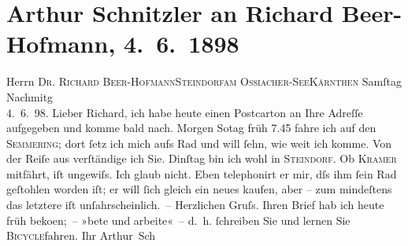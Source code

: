 

         
         \renewcommand{\erwaehntePersonen}{Personen: Richard Beer-Hofmann, Leopold Kramer}
         \renewcommand{\erwaehnteOrte}{Orte: I., Innere Stadt, Kärnten, Ossiacher See, Semmering, Steindorf am Ossiacher See, Wien}
         \renewcommand{\erwaehnteWerke}{}
               \section[Arthur Schnitzler an Richard Beer-Hofmann, 4. 6. 1898]{ Arthur Schnitzler an Richard Beer-Hofmann, 4. 6. 1898}\nopagebreak{}\rehead{ }\begin{ledgroupsized}[t]{13cm}\normalsize\beginnumbering \toendnotes[C]{\smallbreak\pagebreak[2]} 
\pstart{}{\pb}Herrn \textsc{Dr. Richard
                     Beer-Hofmann}\pend{}\pstart{}\textsc{Steindorf}\pend{}\pstart{}\textsc{am Ossiacher-See}\pend{}\pstart{}\textsc{Kärnthen}\pend{}{\bigskip}\pstart
           \raggedleft{}{\pb}Samſtag{ }Nachmitg{\\}4. 6. 98.\pend
           \pstart
           Lieber Richard, ich habe heute einen Postcarton an Ihre Adreſſe
               aufgegeben und komme bald nach. Morgen So{\geminationn}tag{ }früh 7.45 fahre ich auf den \textsc{Semmering}; dort ſetz ich mich aufs Rad und will ſehn, wie weit ich komme. Von der {\pb}Reiſe aus verſtändige ich Sie. Dinſtag
               bin ich wohl in \textsc{Steindorf}. Ob \textsc{Kramer} mitfährt, iſt ungewiſs. Ich glaub nicht. Eben telephonirt er mir, dſs ihm ſein
               Rad geſtohlen worden iſt; er will ſich gleich ein neues kaufen, aber – zum mindeſtens
               das letztere {\pb}iſt unſahrscheinlich. –\pend
           \pstart
           Herzlichen Gruſs. Ihren Brief hab ich heute früh beko{\geminationm}en; – »bete und arbeite« – d. h. ſchreiben Sie und lernen Sie \textsc{Bicycle}fahren.\pend
           \pstart Ihr \spacefill\mbox{Arthur Sch}\pend{}
         
         \endnumbering{}\end{ledgroupsized}  \newcommand{\dateiname}{L00801}\newcommand{\titel}{Arthur Schnitzler an Richard Beer-Hofmann, 4. 6. 1898}\newcommand{\editorInnen}{Martin Anton Müller und Gerd-Hermann Susen}
      